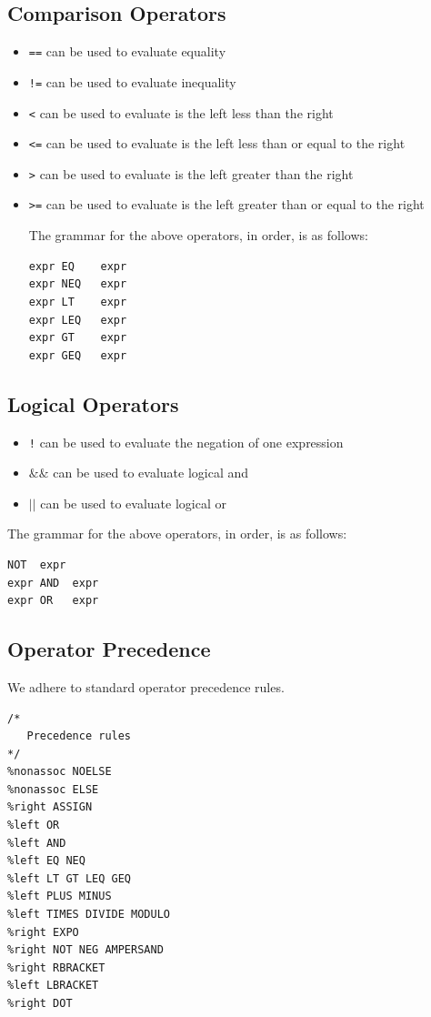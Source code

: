 \documentclass{article}
\begin{document}
\subsection{Comparison Operators}
\begin{itemize}
\item \texttt{==} can be used to evaluate equality
\item \texttt{!=} can be used to evaluate inequality
\item \texttt{<} can be used to evaluate is the left less than the right
\item \texttt{<=} can be used to evaluate is the left less than or equal to the right
\item \texttt{>} can be used to evaluate is the left greater than the right
\item \texttt{>=} can be used to evaluate is the left greater than or equal to the right

The grammar for the above operators, in order, is as follows:
\begin{Verbatim}[frame=single]
expr EQ    expr
expr NEQ   expr
expr LT    expr
expr LEQ   expr
expr GT    expr
expr GEQ   expr
\end{Verbatim}
\end{itemize}

\subsection{Logical Operators}
\begin{itemize}
\item \texttt{!} can be used to evaluate the negation of one expression
\item \texttt{$\&\&$} can be used to evaluate logical and
\item \texttt{$\vert\vert$} can be used to evaluate logical or
\end{itemize}

The grammar for the above operators, in order, is as follows:
\begin{Verbatim}[frame=single]
NOT  expr
expr AND  expr
expr OR   expr
\end{Verbatim}

\subsection{Operator Precedence}
We adhere to standard operator precedence rules. 


\begin{Verbatim}[frame=single]
/* 
   Precedence rules 
*/
%nonassoc NOELSE 
%nonassoc ELSE 
%right ASSIGN 
%left OR
%left AND
%left EQ NEQ
%left LT GT LEQ GEQ 
%left PLUS MINUS 
%left TIMES DIVIDE MODULO
%right EXPO
%right NOT NEG AMPERSAND
%right RBRACKET
%left LBRACKET
%right DOT
\end{Verbatim}
\end{document}
